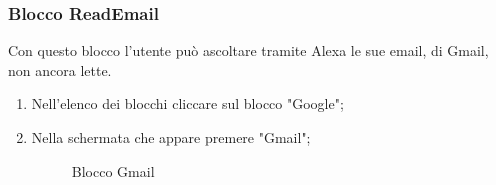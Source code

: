 \subsubsection{Blocco ReadEmail}
Con questo blocco l'utente può ascoltare tramite Alexa le sue email, di Gmail, non ancora lette.
\begin{enumerate}
	\item Nell'elenco dei blocchi cliccare sul blocco "Google";
	\item Nella schermata che appare premere "Gmail";
	\begin{figure}[!ht]
		\centering
		\caption{Blocco Gmail}
	\end{figure}

\end{enumerate}
